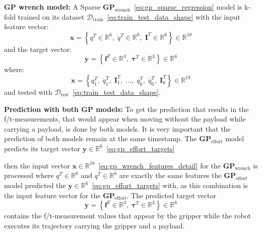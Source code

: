     
    \vspace{1em}
    \textbf{GP wrench model:}
    A Sparse \(\boldsymbol{GP}_{\text{wrench}}\)~\eqref{eq:gp_sparse_regression} model is k-fold trained on its dataset \(\mathcal{D}_{\text{train}}\)~\eqref{eq:train_test_data_shape} with the input feature vector:
    \begin{equation}
    \boldsymbol{x} = \left\{ q^T \in \mathbb{R}^{6}, \; \ddot{q}^T \in \mathbb{R}^{6}, \; \boldsymbol{I}^T \in \mathbb{R}^{6} \right\} \in \mathbb{R}^{18}
    \label{eq:gp_wrench_features_base}
    \end{equation}
    and the target vector:
    \begin{equation}
    \boldsymbol{y} = \left\{ \boldsymbol{f}^T \in \mathbb{R}^{3}, \; \boldsymbol{\tau}^T \in \mathbb{R}^{3} \right\} \in \mathbb{R}^{6}
    \label{eq:gp_wrench_targets}
    \end{equation}
    where:
    \begin{equation}
    \boldsymbol{x} = \left\{ q^T_1, \; \ddot{q}^T_1, \; \boldsymbol{I}^T_1, \; \ldots, \; q^T_6, \; \ddot{q}^T_6, \; \boldsymbol{I}^T_6 \right\} \in \mathbb{R}^{18}
    \label{eq:gp_wrench_features_detail}
    \end{equation}
    and tested with \(\mathcal{D}_{\text{test}}\)~\eqref{eq:train_test_data_shape}.
    
    \vspace{1em}
    \textbf{Prediction with both GP models:}
    To get the prediction that results in the f/t-measurements, that would appear when moving without the payload while carrying a payload, is done by both models. It is very important that the prediction of both models remain at the same timestamp. The \(\boldsymbol{GP}_{\text{effort}}\) model predicts its target vector $\boldsymbol{y} \in \mathbb{R}^{6}$~\eqref{eq:gp_effort_targets}

    then the input vector $\boldsymbol{x} \in \mathbb{R}^{18}$~\eqref{eq:gp_wrench_features_detail} for the \(\boldsymbol{GP}_{\text{wrench}}\) is processed where $q^T \in \mathbb{R}^6$ and $\ddot{q^T} \in \mathbb{R}^6$ are exactly the same features the \(\boldsymbol{GP}_{\text{effort}}\) model predicted the $\boldsymbol{y} \in \mathbb{R}^{6}$~\eqref{eq:gp_effort_targets} with, as this combination is the input feature vector for the \(\boldsymbol{GP}_{\text{effort}}\). The predicted target vector 
    \[
    \boldsymbol{y} = \left\{ \boldsymbol{f}^T \in \mathbb{R}^{3}, \; \boldsymbol{\tau}^T \in \mathbb{R}^{3} \right\} \in \mathbb{R}^{6}
    \]
    contains the f/t-measurement values that appear by the gripper while the robot executes its trajectory carrying the gripper and a payload.
